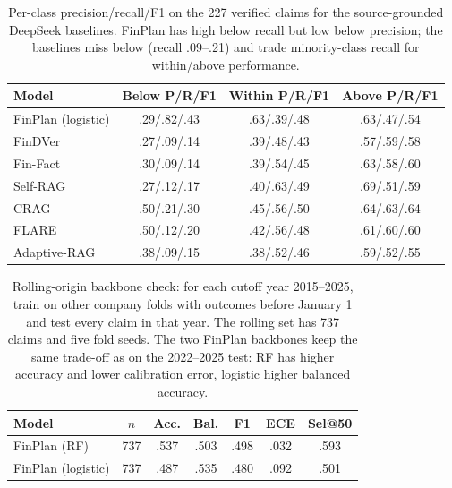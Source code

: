 \documentclass[11pt]{article}
\begin{document}
\begin{table}[t]
\centering
\scriptsize
\setlength{\tabcolsep}{2pt}
\begin{tabular}{lccc}
\toprule
Model & Below P/R/F1 & Within P/R/F1 & Above P/R/F1 \\
\midrule
FinPlan (logistic) & .29/.82/.43 & .63/.39/.48 & .63/.47/.54 \\
FinDVer & .27/.09/.14 & .39/.48/.43 & .57/.59/.58 \\
Fin-Fact & .30/.09/.14 & .39/.54/.45 & .63/.58/.60 \\
Self-RAG & .27/.12/.17 & .40/.63/.49 & .69/.51/.59 \\
CRAG & .50/.21/.30 & .45/.56/.50 & .64/.63/.64 \\
FLARE & .50/.12/.20 & .42/.56/.48 & .61/.60/.60 \\
Adaptive-RAG & .38/.09/.15 & .38/.52/.46 & .59/.52/.55 \\
\bottomrule
\end{tabular}
\caption{Per-class precision/recall/F1 on the 227 verified claims for the source-grounded DeepSeek baselines. FinPlan has high below recall but low below precision; the baselines miss below (recall .09--.21) and trade minority-class recall for within/above performance.}
\label{tab:per-class}
\end{table}

\begin{table}[t]
\centering
\footnotesize
\setlength{\tabcolsep}{1.5pt}
\begin{tabular}{lcccccc}
\toprule
Model & $n$ & Acc. & Bal. & F1 & ECE & Sel@50 \\
\midrule
FinPlan (RF) & 737 & .537 & .503 & .498 & .032 & .593 \\
FinPlan (logistic) & 737 & .487 & .535 & .480 & .092 & .501 \\
\bottomrule
\end{tabular}
\caption{Rolling-origin backbone check: for each cutoff year 2015--2025, train on other company folds with outcomes before January 1 and test every claim in that year. The rolling set has 737 claims and five fold seeds. The two FinPlan backbones keep the same trade-off as on the 2022--2025 test: RF has higher accuracy and lower calibration error, logistic higher balanced accuracy.}
\label{tab:rolling}
\end{table}
\end{document}
